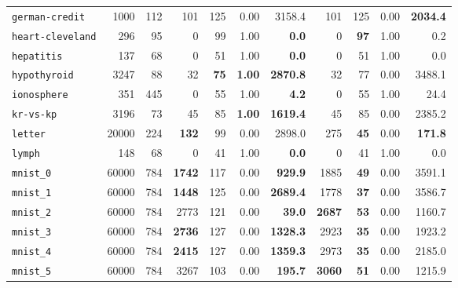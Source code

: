 \begin{tabular}{lccrrrrrrrr}
\texttt{german-credit} & \multicolumn{1}{r}{1000} & \multicolumn{1}{r}{112}  & 101 & 125 & 0.00 & 3158.4 & 101 & 125 & 0.00 & \textbf{2034.4}\\
\texttt{heart-cleveland} & \multicolumn{1}{r}{296} & \multicolumn{1}{r}{95}  & 0 & 99 & 1.00 & \textbf{0.0} & 0 & \textbf{97} & 1.00 & 0.2\\
\texttt{hepatitis} & \multicolumn{1}{r}{137} & \multicolumn{1}{r}{68}  & 0 & 51 & 1.00 & \textbf{0.0} & 0 & 51 & 1.00 & 0.0\\
\texttt{hypothyroid} & \multicolumn{1}{r}{3247} & \multicolumn{1}{r}{88}  & 32 & \textbf{75} & \textbf{1.00} & \textbf{2870.8} & 32 & 77 & 0.00 & 3488.1\\
\texttt{ionosphere} & \multicolumn{1}{r}{351} & \multicolumn{1}{r}{445}  & 0 & 55 & 1.00 & \textbf{4.2} & 0 & 55 & 1.00 & 24.4\\
\texttt{kr-vs-kp} & \multicolumn{1}{r}{3196} & \multicolumn{1}{r}{73}  & 45 & 85 & \textbf{1.00} & \textbf{1619.4} & 45 & 85 & 0.00 & 2385.2\\
\texttt{letter} & \multicolumn{1}{r}{20000} & \multicolumn{1}{r}{224}  & \textbf{132} & 99 & 0.00 & 2898.0 & 275 & \textbf{45} & 0.00 & \textbf{171.8}\\
\texttt{lymph} & \multicolumn{1}{r}{148} & \multicolumn{1}{r}{68}  & 0 & 41 & 1.00 & \textbf{0.0} & 0 & 41 & 1.00 & 0.0\\
\texttt{mnist\_0} & \multicolumn{1}{r}{60000} & \multicolumn{1}{r}{784}  & \textbf{1742} & 117 & 0.00 & \textbf{929.9} & 1885 & \textbf{49} & 0.00 & 3591.1\\
\texttt{mnist\_1} & \multicolumn{1}{r}{60000} & \multicolumn{1}{r}{784}  & \textbf{1448} & 125 & 0.00 & \textbf{2689.4} & 1778 & \textbf{37} & 0.00 & 3586.7\\
\texttt{mnist\_2} & \multicolumn{1}{r}{60000} & \multicolumn{1}{r}{784}  & 2773 & 121 & 0.00 & \textbf{39.0} & \textbf{2687} & \textbf{53} & 0.00 & 1160.7\\
\texttt{mnist\_3} & \multicolumn{1}{r}{60000} & \multicolumn{1}{r}{784}  & \textbf{2736} & 127 & 0.00 & \textbf{1328.3} & 2923 & \textbf{35} & 0.00 & 1923.2\\
\texttt{mnist\_4} & \multicolumn{1}{r}{60000} & \multicolumn{1}{r}{784}  & \textbf{2415} & 127 & 0.00 & \textbf{1359.3} & 2973 & \textbf{35} & 0.00 & 2185.0\\
\texttt{mnist\_5} & \multicolumn{1}{r}{60000} & \multicolumn{1}{r}{784}  & 3267 & 103 & 0.00 & \textbf{195.7} & \textbf{3060} & \textbf{51} & 0.00 & 1215.9\\

\end{tabular}
